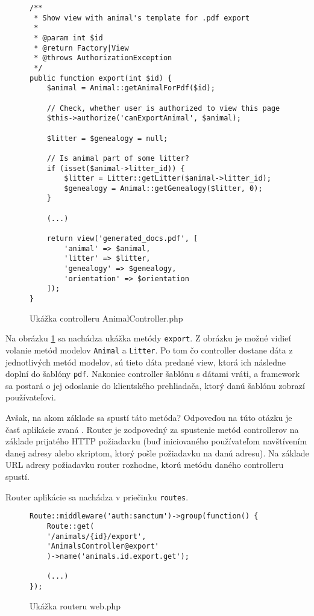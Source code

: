 \begin{figure}[H]
\begin{verbatim}
/**
 * Show view with animal's template for .pdf export
 *
 * @param int $id
 * @return Factory|View
 * @throws AuthorizationException
 */
public function export(int $id) {
    $animal = Animal::getAnimalForPdf($id);

    // Check, whether user is authorized to view this page
    $this->authorize('canExportAnimal', $animal);

    $litter = $genealogy = null;

    // Is animal part of some litter?
    if (isset($animal->litter_id)) {
        $litter = Litter::getLitter($animal->litter_id);
        $genealogy = Animal::getGenealogy($litter, 0);
    }
    
    (...)
        
    return view('generated_docs.pdf', [
        'animal' => $animal,
        'litter' => $litter,
        'genealogy' => $genealogy,
        'orientation' => $orientation
    ]);
}
\end{verbatim}
\caption[Ukážka controlleru AnimalController.php]
{Ukážka controlleru AnimalController.php}
\label{animal-controller-view-code}
\end{figure}

Na obrázku \ref{animal-controller-view-code} sa nachádza ukážka metódy \texttt{export}. Z obrázku je možné vidieť volanie metód modelov \texttt{Animal} a \texttt{Litter}. Po tom čo controller dostane dáta z jednotlivých metód modelov, sú tieto dáta predané view, ktorá ich následne doplní do šablóny \texttt{pdf}. Nakoniec controller šablónu s dátami vráti, a framework sa postará o jej odoslanie do klientského prehliadača, ktorý danú šablónu zobrazí používateľovi.

Avšak, na akom základe sa spustí táto metóda? Odpoveďou na túto otázku je časť aplikácie zvaná .
Router je zodpovedný za spustenie metód controllerov na základe prijatého HTTP požiadavku (buď iniciovaného používateľom navštívením danej adresy alebo skriptom, ktorý pošle požiadavku na danú adresu). Na základe URL adresy požiadavku router rozhodne, ktorú metódu daného controlleru spustí.

Router aplikácie sa nachádza v priečinku \texttt{routes}.

\begin{figure}[H]
\begin{verbatim}
Route::middleware('auth:sanctum')->group(function() {
    Route::get(
    '/animals/{id}/export',
    'AnimalsController@export'
    )->name('animals.id.export.get');
    
    (...)
});
\end{verbatim}
\caption[Ukážka routeru web.php]
{Ukážka routeru web.php}
\label{router-code}
\end{figure}

